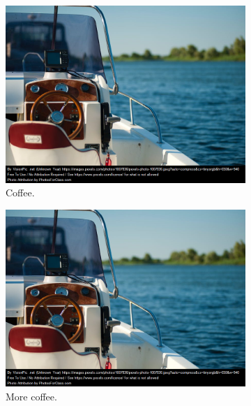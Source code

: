 \documentclass{article}
\begin{document}
	\begin{figure}[h!]
		\centering
		\begin{subfigure}[b]{0.2\linewidth}
			\includegraphics[width=\linewidth]{boat.png}
			\caption{Coffee.}
		\end{subfigure}
		\begin{subfigure}[b]{0.2\linewidth}
			\includegraphics[width=\linewidth]{boat.png}
			\caption{More coffee.}
		\end{subfigure}
		\begin{subfigure}[b]{0.2\linewidth}

\end{subfigure}
\end{figure}
\end{document}
